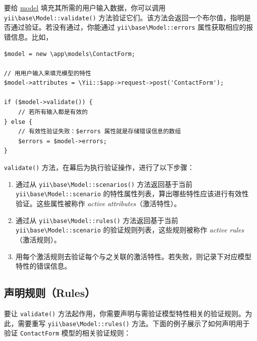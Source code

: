 要给 \hyperref[structure-models.md]{model} 填充其所需的用户输入数据，你可以调用 \texttt{yii{\allowbreak{}\textbackslash}base{\allowbreak{}\textbackslash}Model\allowbreak{}::\allowbreak{}validate()} 方法验证它们。该方法会返回一个布尔值，指明是否通过验证。若没有通过，你能通过 \texttt{yii{\allowbreak{}\textbackslash}base{\allowbreak{}\textbackslash}Model\allowbreak{}::\allowbreak{}errors} 属性获取相应的报错信息。比如，

\lstset{language=php}\begin{lstlisting}
$model = new \app\models\ContactForm;

// 用用户输入来填充模型的特性
$model->attributes = \Yii::$app->request->post('ContactForm');

if ($model->validate()) {
    // 若所有输入都是有效的
} else {
    // 有效性验证失败：$errors 属性就是存储错误信息的数组
    $errors = $model->errors;
}
\end{lstlisting}
\lstinline|validate()| 方法，在幕后为执行验证操作，进行了以下步骤：

\begin{enumerate}
\item 通过从 \texttt{yii{\allowbreak{}\textbackslash}base{\allowbreak{}\textbackslash}Model\allowbreak{}::\allowbreak{}scenarios()} 方法返回基于当前 \texttt{yii{\allowbreak{}\textbackslash}base{\allowbreak{}\textbackslash}Model\allowbreak{}::\allowbreak{}scenario} 的特性属性列表，算出哪些特性应该进行有效性验证。这些属性被称作 \textit{active attributes}（激活特性）。
\item 通过从 \texttt{yii{\allowbreak{}\textbackslash}base{\allowbreak{}\textbackslash}Model\allowbreak{}::\allowbreak{}rules()} 方法返回基于当前 \texttt{yii{\allowbreak{}\textbackslash}base{\allowbreak{}\textbackslash}Model\allowbreak{}::\allowbreak{}scenario} 的验证规则列表，这些规则被称作 \textit{active rules}（激活规则）。
\item 用每个激活规则去验证每个与之关联的激活特性。若失败，则记录下对应模型特性的错误信息。
\end{enumerate}
\subsection{声明规则（Rules） \label{input-validation.md::declaring-rules}}
要让 \lstinline|validate()| 方法起作用，你需要声明与需验证模型特性相关的验证规则。为此，需要重写 \texttt{yii{\allowbreak{}\textbackslash}base{\allowbreak{}\textbackslash}Model\allowbreak{}::\allowbreak{}rules()} 方法。下面的例子展示了如何声明用于验证 \lstinline|ContactForm| 模型的相关验证规则：

